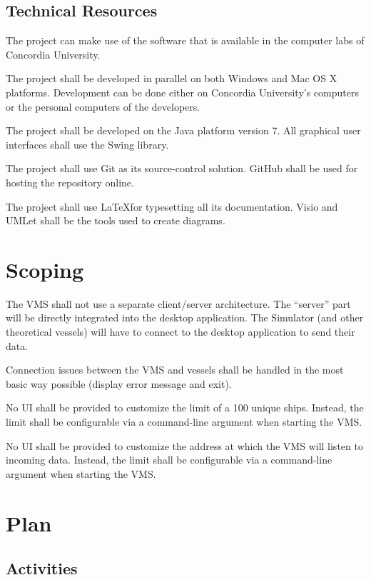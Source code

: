 \documentclass{article}
\begin{document}
\subsection{Technical Resources} %

The project can make use of the software that is available in the computer labs of Concordia University. 

The project shall be developed in parallel on both Windows and Mac OS X platforms. Development can be done either on Concordia University's computers or the personal computers of the developers.

The project shall be developed on the Java platform version 7. All graphical user interfaces shall use the Swing library.

The project shall use Git as its source-control solution. GitHub shall be used for hosting the repository online.

The project shall use \LaTeX for typesetting all its documentation. Visio and UMLet shall be the tools used to create diagrams.

\section{Scoping} %
The VMS shall not use a separate client/server architecture. The ``server'' part will be directly integrated into the desktop application. The Simulator (and other theoretical vessels) will have to connect to the desktop application to send their data.

Connection issues between the VMS and vessels shall be handled in the most basic way possible (display error message and exit).

No UI shall be provided to customize the limit of a 100 unique ships. Instead, the limit shall be configurable via a command-line argument when starting the VMS. 

No UI shall be provided to customize the address at which the VMS will listen to incoming data. Instead, the limit shall be configurable via a command-line argument when starting the VMS.

\section{Plan} %

\subsection{Activities}
\end{document}
